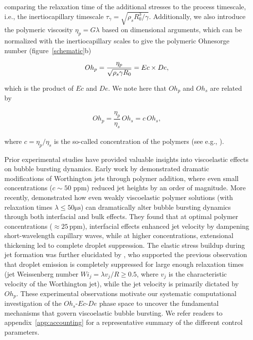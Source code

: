 \documentclass{jfm}
\newcommand{\DL}[1]{{\textcolor{black}{#1}}}
\newcommand{\oo}{\color{black} \normalfont}
\newcommand{\bb}{\color{black} \normalfont}
\begin{document}
\noindent comparing the relaxation time of the additional stresses to the process timescale, i.e., the inertiocapillary timescale $\tau_{\gamma} = \sqrt{\rho_sR_0^3/\gamma}$. Additionally, we also introduce the polymeric viscosity $\eta_p = G\lambda$ based on dimensional arguments, which can be normalized with the inertiocapillary scales to give the polymeric Ohnesorge number (figure~\ref{schematic}b)

\begin{align}
	\label{eq:Ohpdef}
	Oh_p = \frac{\eta_p}{\sqrt{\rho_s\gamma R_0}} = \DL{Ec \times De},
\end{align}

\noindent which is the product of $Ec$ and $De$. \oo We note here that $Oh_p$ and $Oh_s$ are related by

\begin{align}
	Oh_p = \dfrac{\eta_p}{\eta_s} \, Oh_s = c\,Oh_s,
\end{align}

\noindent where $c = \eta_p/\eta_s$ is the so-called concentration of the polymers (see e.g., \citet{remmelgas1999computational, hinch2024fast}). \bb

\oo Prior experimental studies have provided valuable insights into viscoelastic effects on bubble bursting dynamics. Early work by \citet{cheny1996extravagant} demonstrated dramatic modifications of Worthington jets through polymer addition, where even small concentrations ($c \sim 50$ ppm) reduced jet heights by an order of magnitude.
More recently, \citet{rodriguez2023bubble} demonstrated how even weakly viscoelastic polymer solutions (with relaxation times $\lambda \leq 50\si{\micro\second}$) can dramatically alter bubble bursting dynamics through both interfacial and bulk effects. They found that at optimal polymer concentrations ($\approx 25\,\text{ppm}$), interfacial effects enhanced jet velocity by dampening short-wavelength capillary waves, while at higher concentrations, extensional thickening led to complete droplet suppression.
The elastic stress buildup during jet formation was further elucidated by \citet{cabalganteeffect}, who supported the previous observation that droplet emission is completely suppressed for large enough relaxation times (jet Weissenberg number $Wi_j = \lambda v_j/R \ge 0.5$, where $v_j$ is the characteristic velocity of the Worthington jet), while the jet velocity is primarily dictated by $Oh_p$. These experimental observations motivate our systematic computational investigation of the $Oh_s$-$Ec$-$De$ phase space to uncover the fundamental mechanisms that govern viscoelastic bubble bursting. We refer readers to appendix~\ref{app:accounting} for a representative summary of the different control parameters.\bb
\end{document}
